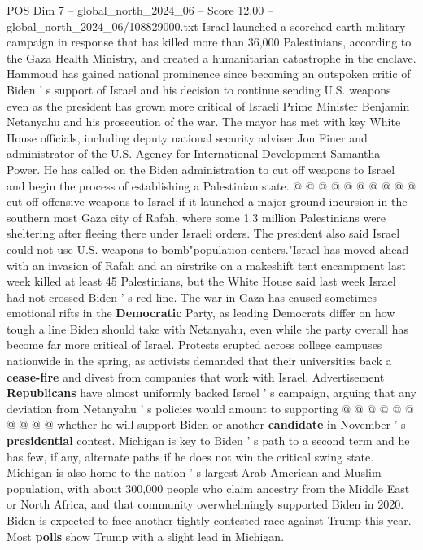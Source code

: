 \begin{textsample}{POS Dim 7 – global\_north\_2024\_06 – Score 12.00 – global\_north\_2024\_06/108829000.txt}
Israel launched a scorched-earth military campaign in response that has killed more than 36,000 Palestinians, according to the Gaza Health Ministry, and created a humanitarian catastrophe in the enclave.
Hammoud has gained national prominence since becoming an outspoken critic of Biden ' s support of Israel and his decision to continue sending U.S. weapons even as the president has grown more critical of Israeli Prime Minister Benjamin Netanyahu and his prosecution of the war.
The mayor has met with key White House officials, including deputy national security adviser Jon Finer and administrator of the U.S.
Agency for International Development Samantha Power.
He has called on the Biden administration to cut off weapons to Israel and begin the process of establishing a Palestinian state. @ @ @ @ @ @ @ @ @ @ cut off offensive weapons to Israel if it launched a major ground incursion in the southern most Gaza city of Rafah, where some 1.3 million Palestinians were sheltering after fleeing there under Israeli orders.
The president also said Israel could not use U.S. weapons to bomb"population centers."Israel has moved ahead with an invasion of Rafah and an airstrike on a makeshift tent encampment last week killed at least 45 Palestinians, but the White House said last week Israel had not crossed Biden ' s red line.
The war in Gaza has caused sometimes emotional rifts in the \textbf{Democratic} Party, as leading Democrats differ on how tough a line Biden should take with Netanyahu, even while the party overall has become far more critical of Israel.
Protests erupted across college campuses nationwide in the spring, as activists demanded that their universities back a \textbf{cease-fire} and divest from companies that work with Israel.
Advertisement \textbf{Republicans} have almost uniformly backed Israel ' s campaign, arguing that any deviation from Netanyahu ' s policies would amount to supporting @ @ @ @ @ @ @ @ @ @ whether he will support Biden or another \textbf{candidate} in November ' s \textbf{presidential} contest.
Michigan is key to Biden ' s path to a second term and he has few, if any, alternate paths if he does not win the critical swing state.
Michigan is also home to the nation ' s largest Arab American and Muslim population, with about 300,000 people who claim ancestry from the Middle East or North Africa, and that community overwhelmingly supported Biden in 2020.
Biden is expected to face another tightly contested race against Trump this year.
Most \textbf{polls} show Trump with a slight lead in Michigan.

\end{textsample}
